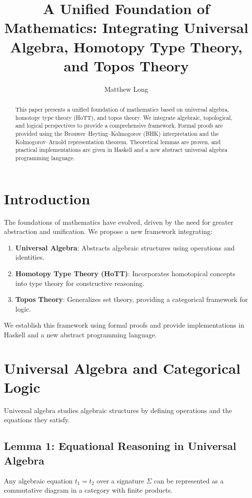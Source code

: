 \documentclass{article}
\title{A Unified Foundation of Mathematics: Integrating Universal Algebra, Homotopy Type Theory, and Topos Theory}
\author{Matthew Long}
\date{}
\begin{document}
\maketitle

\begin{abstract}
This paper presents a unified foundation of mathematics based on universal algebra, homotopy type theory (HoTT), and topos theory. We integrate algebraic, topological, and logical perspectives to provide a comprehensive framework. Formal proofs are provided using the Brouwer–Heyting–Kolmogorov (BHK) interpretation and the Kolmogorov–Arnold representation theorem. Theoretical lemmas are proven, and practical implementations are given in Haskell and a new abstract universal algebra programming language.
\end{abstract}

\tableofcontents

\section{Introduction}

The foundations of mathematics have evolved, driven by the need for greater abstraction and unification. We propose a new framework integrating:

\begin{enumerate}
    \item \textbf{Universal Algebra}: Abstracts algebraic structures using operations and identities.
    \item \textbf{Homotopy Type Theory (HoTT)}: Incorporates homotopical concepts into type theory for constructive reasoning.
    \item \textbf{Topos Theory}: Generalizes set theory, providing a categorical framework for logic.
\end{enumerate}

We establish this framework using formal proofs and provide implementations in Haskell and a new abstract programming language.

\section{Universal Algebra and Categorical Logic}

Universal algebra studies algebraic structures by defining operations and the equations they satisfy.

\subsection{Lemma 1: Equational Reasoning in Universal Algebra}
Any algebraic equation \( t_1 = t_2 \) over a signature \( \Sigma \) can be represented as a commutative diagram in a category with finite products.
\end{document}
